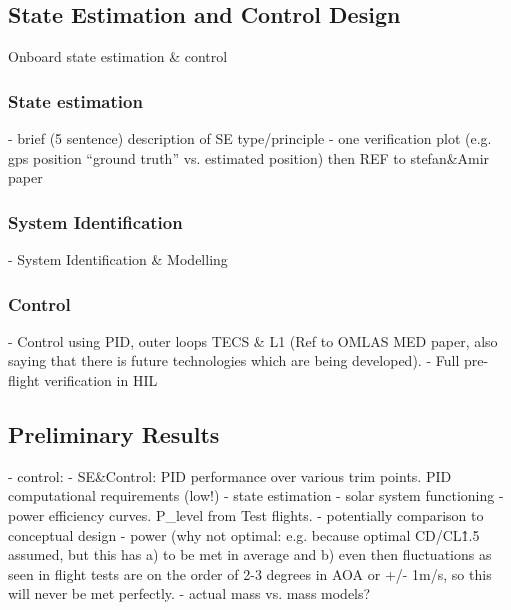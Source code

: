 \subsection{State Estimation and Control Design}
Onboard state estimation \& control
\subsubsection{State estimation}
  - brief (5 sentence) description of SE type/principle
  - one verification plot (e.g. gps position ``ground truth'' vs. estimated position) 
  then REF to stefan\&Amir paper

\subsubsection{System Identification}
 - System Identification \& Modelling
 
 \subsubsection{Control}
 - Control using PID,  outer loops TECS \& L1 (Ref to OMLAS MED paper, also saying that there is future technologies which are being developed).
 - Full pre-flight verification in HIL
 
\subsection{Preliminary Results}
  - control:   - SE\&Control: PID performance over various trim points. PID computational requirements (low!)
  - state estimation
  - solar system functioning
   - power efficiency curves. P\_level from Test flights.
   - potentially comparison to conceptual design 
   	- power (why not optimal: e.g. because optimal CD/CL\^1.5 assumed, but this has a) to be met in average and b) even then fluctuations as seen in flight tests are on the order of 2-3 degrees in AOA or +/- 1m/s, so this will never be met perfectly.
   	- actual mass vs. mass models?
